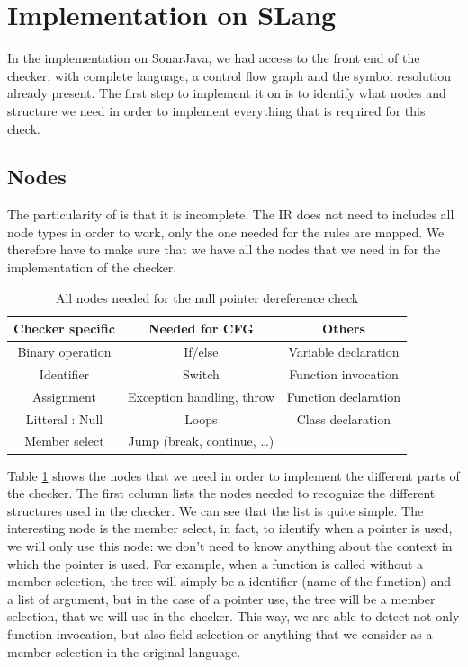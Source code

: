 \section{Implementation on SLang}
\label{sec:implementation_slang}

In the implementation on SonarJava, we had access to the front end of the checker, with complete language, a control flow graph and the symbol resolution already present.
The first step to implement it on \slang{} is to identify what nodes and structure we need in order to implement everything that is required for this check.

\subsection{Nodes}
\label{subsec:nodes}

The particularity of \slang{}  is that it is incomplete. 
The IR does not need to includes all node types in order to work, only the one needed for the rules are mapped. 
We therefore have to make sure that we have all the nodes that we need in \slang{} for the implementation of the checker.

\begin{table}[h]
	\caption{All nodes needed for the null pointer dereference check}
	\label{table:nodes-needed}
	\begin{tabular}{|c|c|c|}
		\hline
		\bf Checker specific & \bf Needed for CFG & \bf Others  \\ \hline
	    Binary operation & If/else & Variable declaration \\
		Identifier & Switch & Function invocation \\
		Assignment & Exception handling, throw  & Function declaration \\
		Litteral : Null & Loops & Class declaration \\
		Member select & Jump (break, continue, …) & \\ \hline
	\end{tabular}
\end{table}

Table \ref{table:nodes-needed} shows the nodes that we need in order to implement the different parts of the checker.
The first column lists the nodes needed to recognize the different structures used in the checker. 
We can see that the list is quite simple. 
The interesting node is the member select, in fact, to identify when a pointer is used, we will only use this node: we don’t need to know anything about the context in which the pointer is used. 
For example, when a function is called without a member selection, the tree will simply be a identifier (name of the function) and a list of argument, but in the case of a pointer use, the tree will be a member selection, that we will use in the checker. 
This way, we are able to detect not only function invocation, but also field selection or anything that we consider as a member selection in the original language.

